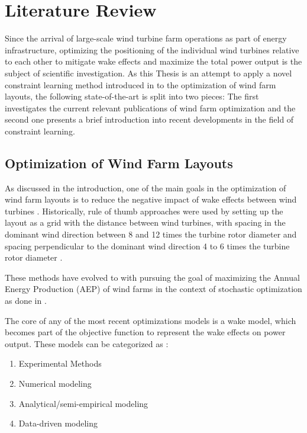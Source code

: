\documentclass[preprint,12pt]{elsarticle}
\begin{document}
\section{Literature Review}\label{chapter:state_of_the_art}

Since the arrival of large-scale wind turbine farm operations as part of energy infrastructure, optimizing the positioning of the individual wind turbines relative to each other to mitigate wake effects and maximize the total power output is the subject of scientific investigation. As this Thesis is an attempt to apply a novel constraint learning method introduced in \cite{ALCANTARA2023120895} to the optimization of wind farm layouts, the following state-of-the-art is split into two pieces:  The first investigates the current relevant publications of wind farm optimization and the second one presents a brief introduction into recent developments in the field of constraint learning. 

\subsection{Optimization of Wind Farm Layouts}

As discussed in the introduction, one of the main goals in the optimization of wind farm layouts is to reduce the negative impact of wake effects between wind turbines \cite{KIM2024123383}. Historically, rule of thumb approaches were used by setting up the layout as a grid  with the distance between wind turbines, with spacing in the dominant wind direction between 8 and 12 times the turbine rotor diameter and spacing perpendicular to the dominant wind direction 4 to 6 times the turbine rotor diameter \cite{AZLAN2021110047} \cite{hou_review_2019}.

These methods have evolved to with pursuing the goal of maximizing the Annual Energy Production (AEP) of wind farms in the context of stochastic optimization as done in \cite{Sinner_2024} \cite{KIM2024123383}. 

The core of any of the most recent optimizations models is a wake model, which becomes part of the objective function to represent the wake effects on power output. These models can be categorized as \cite{WANG2024118508}: 

\begin{enumerate}
	\item Experimental Methods
	\item Numerical modeling
	\item Analytical/semi-empirical modeling
	\item Data-driven modeling
\end{enumerate}
\end{document}
